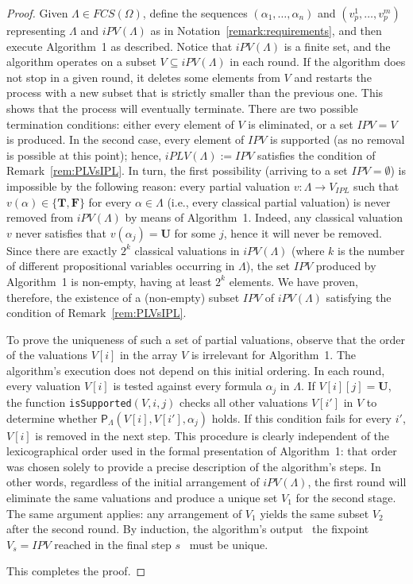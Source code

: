 \documentclass[12pt]{article}
\newcommand{\bT}{\mathbf{T}}
\newcommand{\bU}{\mathbf{U}}
\newcommand{\bF}{\mathbf{F}}
\begin{document}
\begin{proof}
Given $\Lambda \in FCS(\Omega)$, define the sequences $(\alpha_1, \ldots,\alpha_n)$ and $(v_p^1, \ldots, v_p^m)$ representing $\Lambda$ and $iPV(\Lambda)$ as in Notation~\ref{remark:requirements}, and then execute Algorithm~1 as described. Notice that $iPV(\Lambda)$ is a finite set,  and the algorithm operates on a subset $V \subseteq iPV(\Lambda)$ in each round. If the algorithm does not stop in a given round, it deletes some elements from $V$ and restarts the process with a new subset that is strictly smaller than the previous one.
This shows that the process will eventually terminate. There are two possible termination conditions: either every element of $V$ is eliminated, or a set $IPV = V$ is produced. In the second case, every element of $IPV$ is supported (as no removal is possible at this point); hence, $iPLV(\Lambda):=IPV$ satisfies the condition of Remark~\ref{rem:PLVsIPL}.
In turn, the first possibility (arriving to a set $IPV=\emptyset$) is impossible by the following reason: every partial valuation $v :\Lambda \rightarrow V_{IPL}$ such that $v(\alpha) \in \{\bT,\bF\}$ for every $\alpha \in \Lambda$ (i.e., every classical partial valuation) is never removed from $iPV(\Lambda)$ by means of Algorithm~1. Indeed, any classical valuation $v$ never satisfies that $v(\alpha_j)=\bU$ for some $j$, hence it will never be removed. Since there are exactly $2^k$ classical valuations in $iPV(\Lambda)$ (where $k$ is the number of different propositional variables occurring in $\Lambda$), the set $IPV$ produced by Algorithm~1 is non-empty, having at least $2^k$ elements. We have proven, therefore, the existence of a (non-empty) subset $IPV$ of $iPV(\Lambda)$ satisfying the condition of Remark~\ref{rem:PLVsIPL}.

To prove the uniqueness of such a set of partial valuations, observe that the order of the valuations $V[i]$ in the array $V$ is irrelevant for Algorithm~1. The algorithm's execution does not depend on this initial ordering. In each round, every valuation $V[i]$ is tested against every formula $\alpha_j$ in $\Lambda$. If $V[i][j]=\bU$, the function \texttt{isSupported}$(V,i,j)$ checks all other valuations $V[i']$ in $V$ to determine whether $\mathsf{P}_\Lambda(V[i],V[i'],\alpha_j)$ holds. If this condition fails for every $i'$, $V[i]$ is removed in the next step.
This procedure is clearly independent of the lexicographical order used in the formal presentation of Algorithm~1: that order was chosen solely to provide a precise description of the algorithm's steps.
In other words, regardless of the initial arrangement of $iPV(\Lambda)$, the first round will eliminate the same valuations and produce a unique set $V_1$ for the second stage. The same argument applies: any arrangement of $V_1$ yields the same subset $V_2$ after the second round. By induction, the algorithm's output \textemdash\ the fixpoint $V_s = IPV$ reached in the final step $s$ \textemdash\ must be unique.


This completes the proof.
\end{proof}
\end{document}
